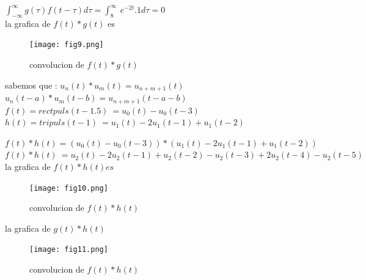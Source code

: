 \documentclass[11pt,a4paper]{article}
\begin{document}
{{\begin{enumerate}
$\int_{-\infty}^{\infty} g(\tau)f(t-\tau) d\tau = \int_{8}^{\infty} \ e^{-2t}.1 d\tau = 0  $\\ \newline
la grafica de $f(t)*g(t)$ es

\begin{figure}[H]
    \centering
    \texttt{[image: fig9.png]}
    \caption{convolucion de $f(t)*g(t)$ }
\end{figure}
\newpage










\newline


sabemos que :\newline \newline
$u_{n}(t)*u_{m}(t)=u_{n+m+1}(t)$\newline
$u_{n}(t-a)*u_{m}(t-b)=u_{n+m+1}(t-a-b)$\newline\newline
$f(t)=rectpuls(t-1.5)\ = u_0(t)-u_0(t-3)$\newline 
$h(t)=tripuls(t-1) \ = u_1(t)-2u_1(t-1)+u_1(t-2)$\newline 

$f(t)*h(t)=(u_0(t)-u_0(t-3))*(u_1(t)-2u_1(t-1)+u_1(t-2))$\newline
$f(t)*h(t) \ =u_2(t)-2u_2(t-1)+u_2(t-2)-u_2(t-3)+2u_2(t-4)-u_2(t-5)$\newline \newline
la grafica de $f(t)*h(t) es $

\begin{figure}[H]
    \centering
    \texttt{[image: fig10.png]}
    \caption{convolucion de $f(t)*h(t)$ }
\end{figure}  \newpage
la grafica de $g(t)*h(t)$\newline \newline
\begin{figure}[H]
    \centering
    \texttt{[image: fig11.png]}
    \caption{convolucion de $f(t)*h(t)$ }
\end{figure}
\newpage











\end{enumerate}}}
\end{document}
